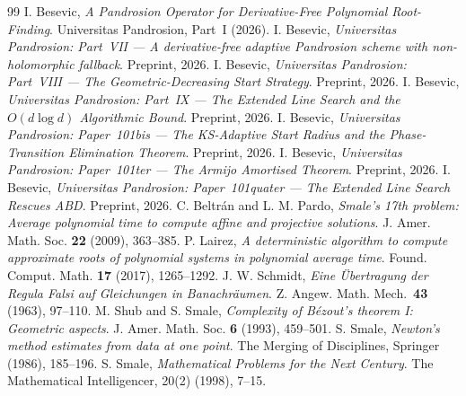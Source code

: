\documentclass[11pt,a4paper]{article}
\begin{document}
\begin{thebibliography}{99}
 I. Besevic, \textit{A Pandrosion Operator for Derivative-Free Polynomial Root-Finding}. Universitas Pandrosion, Part~I (2026).
 I. Besevic, \textit{Universitas Pandrosion: Part~VII --- A derivative-free adaptive Pandrosion scheme with non-holomorphic fallback}. Preprint, 2026.
 I. Besevic, \textit{Universitas Pandrosion: Part~VIII --- The Geometric-Decreasing Start Strategy}. Preprint, 2026.
 I. Besevic, \textit{Universitas Pandrosion: Part~IX --- The Extended Line Search and the $O(d\log d)$ Algorithmic Bound}. Preprint, 2026.
 I. Besevic, \textit{Universitas Pandrosion: Paper~101bis --- The KS-Adaptive Start Radius and the Phase-Transition Elimination Theorem}. Preprint, 2026.
 I. Besevic, \textit{Universitas Pandrosion: Paper~101ter --- The Armijo Amortised Theorem}. Preprint, 2026.
 I. Besevic, \textit{Universitas Pandrosion: Paper~101quater --- The Extended Line Search Rescues ABD}. Preprint, 2026.
 C. Beltr\'an and L. M. Pardo, \textit{Smale's 17th problem: Average polynomial time to compute affine and projective solutions}. J. Amer. Math. Soc. \textbf{22} (2009), 363--385.
 P. Lairez, \textit{A deterministic algorithm to compute approximate roots of polynomial systems in polynomial average time}. Found. Comput. Math. \textbf{17} (2017), 1265--1292.
 J. W. Schmidt, \textit{Eine \"Ubertragung der Regula Falsi auf Gleichungen in Banachr\"aumen}. Z. Angew. Math. Mech.\ \textbf{43} (1963), 97--110.
 M. Shub and S. Smale, \textit{Complexity of B\'ezout's theorem I: Geometric aspects}. J. Amer. Math. Soc. \textbf{6} (1993), 459--501.
 S. Smale, \textit{Newton's method estimates from data at one point}. The Merging of Disciplines, Springer (1986), 185--196.
 S. Smale, \textit{Mathematical Problems for the Next Century}. The Mathematical Intelligencer, 20(2) (1998), 7--15.
\end{thebibliography}
\end{document}
